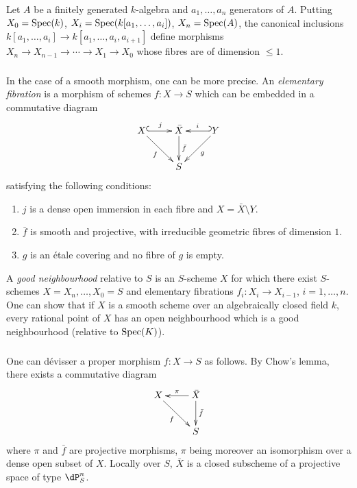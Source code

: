 \subsubsection{}\label{I:3-4-1}

Let $A$ be a finitely generated $k$-algebra and $a_1,\dotsc,a_n$ generators of
$A$. Putting $X_0=\operatorname{Spec}(k)$, $X_i=\operatorname{Spec}(k[a_1,\dotsc,a_i])$,
$X_n=\operatorname{Spec}(A)$, the canonical inclusions
$k[a_1,\dotsc,a_i]\to k[a_1,\dotsc,a_i,a_{i+1}]$ define morphisms
$X_n \to X_{n-1} \to \cdots \to X_1 \to X_0$ whose fibres are of dimension
$\leqslant 1$. 





\subsubsection{}\label{I:3-4-2}

In the case of a smooth morphism, one can be more precise. An
\emph{elementary fibration} is a morphism of schemes $f:X\to S$ which can
be embedded in a commutative diagram
\[\xymatrix{
  X \ar@{^{(}->}[r]^-j \ar[dr]_-f
    & \bar X \ar[d]^-{\bar f}
    & \ar@{_{(}->}[l]_-i \ar[dl]^-g Y \\
  & S
}\]
satisfying the following conditions:
\begin{enumerate}[\indent i)]
  \item $j$ is a dense open immersion in each fibre and
    $X=\bar X \setminus Y$.
  \item $\bar f$ is smooth and projective, with irreducible geometric fibres
    of dimension $1$.
  \item $g$ is an \'etale covering and no fibre of $g$ is empty.
\end{enumerate}

A \emph{good neighbourhood} relative to $S$ is an $S$-scheme $X$ for which there
exist $S$-schemes $X=X_n,\dotsc,X_0=S$ and elementary fibrations
$f_i:X_i\to X_{i-1}$, $i=1,\dotsc,n$. One can show \cite[XI 3.3]{sga4} that if
$X$ is a smooth scheme over an algebraically closed field $k$, every
rational point of $X$ has an open neighbourhood which is a good neighbourhood
(relative to $\operatorname{Spec}(K)$). 





\subsubsection{}\label{I:3-4-3}

One can d\'evisser a proper morphism $f:X\to S$ as follows.
By Chow's lemma, there exists a commutative diagram
\[\xymatrix{
  X \ar[dr]_-f
    & \ar[l]_-\pi \ar[d]^-{\bar f} \bar X \\
  & S
}\]
where $\pi$ and $\bar f$ are projective morphisms, $\pi$ being moreover an
isomorphism over a dense open subset of $X$. Locally over $S$, $\bar X$
is a closed subscheme of a projective space of type $\dP_S^n$.

